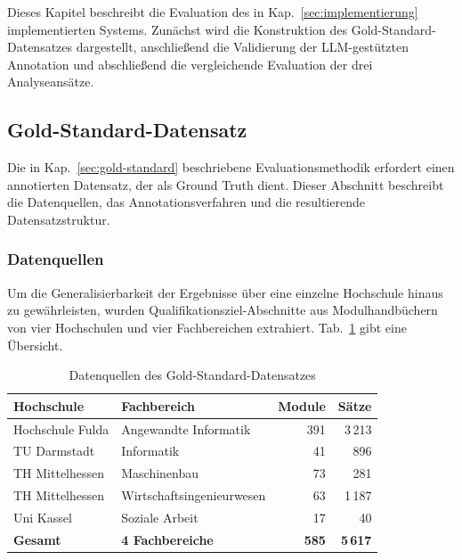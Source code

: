 
Dieses Kapitel beschreibt die Evaluation des in Kap.~\ref{sec:implementierung} implementierten Systems.
Zunächst wird die Konstruktion des Gold-Standard-Datensatzes dargestellt, anschließend die Validierung der LLM-gestützten Annotation und abschließend die vergleichende Evaluation der drei Analyseansätze.

\subsection{Gold-Standard-Datensatz}\label{sec:eval-goldstandard}

Die in Kap.~\ref{sec:gold-standard} beschriebene Evaluationsmethodik erfordert einen annotierten Datensatz, der als Ground Truth dient.
Dieser Abschnitt beschreibt die Datenquellen, das Annotationsverfahren und die resultierende Datensatzstruktur.

\subsubsection{Datenquellen}\label{sec:eval-datenquellen}

Um die Generalisierbarkeit der Ergebnisse über eine einzelne Hochschule hinaus zu gewährleisten, wurden Qualifikationsziel-Abschnitte aus Modulhandbüchern von vier Hochschulen und vier Fachbereichen extrahiert.
Tab.~\ref{tab:datenquellen} gibt eine Übersicht.

\begin{table}[H]
\caption{Datenquellen des Gold-Standard-Datensatzes\label{tab:datenquellen}}
\centering
\small
\begin{tabular}{llrr}
\hline
\textbf{Hochschule} & \textbf{Fachbereich} & \textbf{Module} & \textbf{Sätze} \\
\hline
Hochschule Fulda & Angewandte Informatik & 391 & 3\,213 \\
TU Darmstadt & Informatik & 41 & 896 \\
TH Mittelhessen & Maschinenbau & 73 & 281 \\
TH Mittelhessen & Wirtschaftsingenieurwesen & 63 & 1\,187 \\
Uni Kassel & Soziale Arbeit & 17 & 40 \\
\hline
\textbf{Gesamt} & \textbf{4 Fachbereiche} & \textbf{585} & \textbf{5\,617} \\
\hline
\end{tabular}
\end{table}

